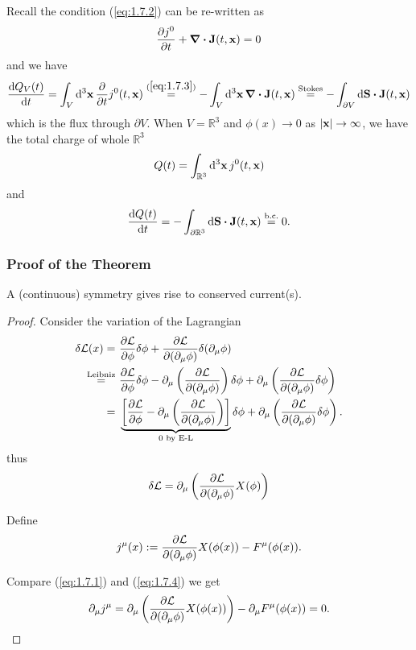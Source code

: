 \documentclass[a4paper,11pt]{article}
\begin{document}
	Recall the condition (\ref{eq:1.7.2}) can be re-written as
	\begin{equation}
		\pdv{j^0}{t}(t,\vb x) + \div \vb J (t, \vb x) = 0
		\label{eq:1.7.3}
	\end{equation}
	and we have
	\[
		\dv{Q_V(t)}{t} = \int_V \dd[3]{\vb x} \pdv{t} j^0(t, \vb x) \overset{(\ref{eq:1.7.3})}{=} - \int_V \dd[3]{\vb x} \div \vb J(t, \vb x) \overset{\text{Stokes}}{=} - \int _{\partial V} \dd{\vb S} \vdot \vb J (t, \vb x)
	\]
	which is the flux through $\partial V$. When $V = \mathbb{R}^3$ and $\phi(x)\to 0$ as $\abs{\vb x}\to \infty$, we have the total charge of whole $\mathbb{R}^3$
	\[
		Q(t) = \int _{\mathbb{R}^3} \dd[3]{\vb x} j^0(t, \vb x)
	\]
	and 
	\[
		\dv{Q(t)}{t} = - \int _{\partial \mathbb{R}^3} \dd{\vb S} \vdot \vb J(t, \vb x) \overset{\text{b.c.}}{=} 0.
	\]

	\subsubsection{Proof of the Theorem}

	\begin{thm}
		A (continuous) symmetry gives rise to conserved current(s).
	\end{thm}
	\begin{proof}
		Consider the variation of the Lagrangian
		\begin{align*}
			\delta \mathcal{L}(x) = &\ \pdv{\mathcal{L}}{\phi} \delta \phi + \pdv{\mathcal{L}}{(\partial_\mu \phi)} \delta(\partial_\mu \phi) \\
			\overset{\text{Leibniz}}{=} &\ \pdv{\mathcal{L}}{\phi} \delta \phi - \partial_\mu \left( \pdv{\mathcal{L}}{(\partial_\mu \phi)} \right) \delta \phi + \partial_\mu \left( \pdv{\mathcal{L}}{(\partial_\mu \phi)} \delta \phi \right)\\
			= &\ \underbrace{\left[ \pdv{\mathcal{L}}{\phi} - \partial_\mu \left( \pdv{\mathcal{L}}{(\partial_\mu \phi)} \right) \right]}_{0 \text{ by E-L}} \delta \phi + \partial_\mu \left( \pdv{\mathcal{L}}{(\partial_\mu \phi)} \delta \phi \right).
		\end{align*}
		thus
		\begin{equation}
			\delta \mathcal{L} = \partial_\mu \left( \pdv{\mathcal{L}}{(\partial_\mu \phi)} X(\phi) \right)
			\label{eq:1.7.4}
		\end{equation}

		Define
		\[
			j^\mu (x) := \pdv{\mathcal{L}}{(\partial_\mu \phi)} X(\phi(x)) - F^\mu(\phi(x)).
		\]
		
		Compare (\ref{eq:1.7.1}) and (\ref{eq:1.7.4}) we get
		\begin{equation}
			\partial_\mu j^\mu = \partial_\mu \left( \pdv{\mathcal{L}}{(\partial_\mu \phi)} X(\phi(x)) \right) - \partial_\mu F^\mu (\phi(x)) = 0.
		\end{equation}
	\end{proof}
	
\end{document}
